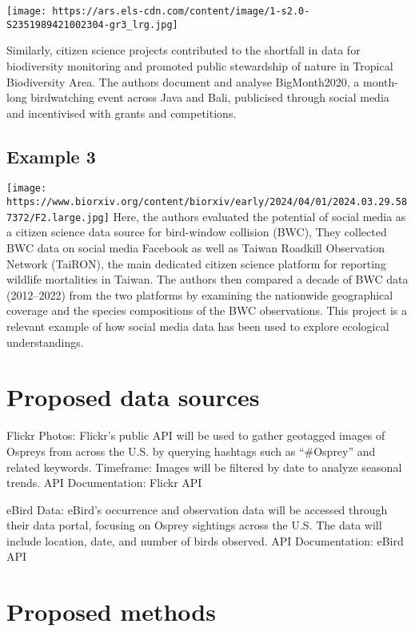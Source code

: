 \documentclass[
]{article}
\begin{document}
\texttt{[image: https://ars.els-cdn.com/content/image/1-s2.0-S2351989421002304-gr3\_lrg.jpg]}

Similarly, citizen science projects contributed to the shortfall in data
for biodiversity monitoring and promoted public stewardship of nature in
Tropical Biodiversity Area. The authors document and analyse
BigMonth2020, a month-long birdwatching event across Java and Bali,
publicised through social media and incentivised with grants and
competitions.

\subsection{Example 3}\label{example-3}

\texttt{[image: https://www.biorxiv.org/content/biorxiv/early/2024/04/01/2024.03.29.587372/F2.large.jpg]}
Here, the authors evaluated the potential of social media as a citizen
science data source for bird-window collision (BWC), They collected BWC
data on social media Facebook as well as Taiwan Roadkill Observation
Network (TaiRON), the main dedicated citizen science platform for
reporting wildlife mortalities in Taiwan. The authors then compared a
decade of BWC data (2012--2022) from the two platforms by examining the
nationwide geographical coverage and the species compositions of the BWC
observations. This project is a relevant example of how social media
data has been used to explore ecological understandings.

\section{Proposed data sources}\label{proposed-data-sources}

Flickr Photos: Flickr's public API will be used to gather geotagged
images of Ospreys from across the U.S. by querying hashtags such as
``\#Osprey'' and related keywords. Timeframe: Images will be filtered by
date to analyze seasonal trends. API Documentation: Flickr API

eBird Data: eBird's occurrence and observation data will be accessed
through their data portal, focusing on Osprey sightings across the U.S.
The data will include location, date, and number of birds observed. API
Documentation: eBird API

\section{Proposed methods}\label{proposed-methods}
\end{document}
